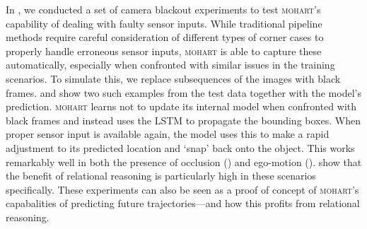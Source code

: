 In , we conducted a set of camera blackout experiments to test \textsc{mohart}'s capability of dealing with faulty sensor inputs. While traditional pipeline methods require careful consideration of different types of corner cases to properly handle erroneous sensor inputs, \textsc{mohart} is able to capture these automatically, especially when confronted with similar issues in the training scenarios. To simulate this, we replace subsequences of the images with black frames.  and  show two such examples from the test data together with the model's prediction. \textsc{mohart} learns not to update its internal model when confronted with black frames and instead uses the LSTM to propagate the bounding boxes. When proper sensor input is available again, the model uses this to make a rapid adjustment to its predicted location and `snap' back onto the object. This works remarkably well in both the presence of occlusion () and ego-motion ().  show that the benefit of relational reasoning is particularly high in these scenarios specifically. These experiments can also be seen as a proof of concept of \textsc{mohart}'s capabalities of predicting future trajectories---and how this profits from relational reasoning.